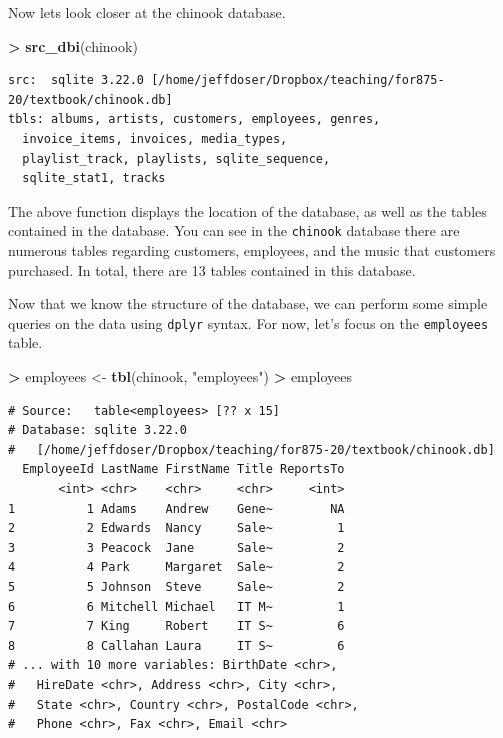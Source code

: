 \documentclass[
]{krantz}
\makeatletter
\newenvironment{Shaded}{\begin{snugshade}}{\end{snugshade}}
\newcommand{\KeywordTok}[1]{\textcolor[rgb]{0.27,0.27,0.27}{\textbf{#1}}}
\newcommand{\NormalTok}[1]{#1}
\newcommand{\OperatorTok}[1]{\textcolor[rgb]{0.43,0.43,0.43}{\textbf{#1}}}
\newcommand{\StringTok}[1]{\textcolor[rgb]{0.5,0.5,0.5}{#1}}
\newenvironment{kframe}{%
\medskip{}
\setlength{\fboxsep}{.8em}
 \def\at@end@of@kframe{}%
 \ifinner\ifhmode%
  \def\at@end@of@kframe{\end{minipage}}%
  \begin{minipage}{\columnwidth}%
 \fi\fi%
 \def\FrameCommand##1{\hskip\@totalleftmargin \hskip-\fboxsep
 \colorbox{shadecolor}{##1}\hskip-\fboxsep
     \hskip-\linewidth \hskip-\@totalleftmargin \hskip\columnwidth}%
 \MakeFramed {\advance\hsize-\width
   \@totalleftmargin\z@ \linewidth\hsize
   \@setminipage}}%
 {\par\unskip\endMakeFramed%
 \at@end@of@kframe}
\renewenvironment{Shaded}{\begin{kframe}}{\end{kframe}}
\makeatother
\begin{document}
Now lets look closer at the chinook database.

\begin{Shaded}
\begin{Highlighting}[]
\OperatorTok{\textgreater{}}\StringTok{ }\KeywordTok{src\_dbi}\NormalTok{(chinook)}
\end{Highlighting}
\end{Shaded}

\begin{verbatim}
src:  sqlite 3.22.0 [/home/jeffdoser/Dropbox/teaching/for875-20/textbook/chinook.db]
tbls: albums, artists, customers, employees, genres,
  invoice_items, invoices, media_types,
  playlist_track, playlists, sqlite_sequence,
  sqlite_stat1, tracks
\end{verbatim}

The above function displays the location of the database, as well as the tables contained in the database. You can see in the \texttt{chinook} database there are numerous tables regarding customers, employees, and the music that customers purchased. In total, there are 13 tables contained in this database.

Now that we know the structure of the database, we can perform some simple queries on the data using \texttt{dplyr} syntax. For now, let's focus on the \texttt{employees} table.

\begin{Shaded}
\begin{Highlighting}[]
\OperatorTok{\textgreater{}}\StringTok{ }\NormalTok{employees \textless{}{-}}\StringTok{ }\KeywordTok{tbl}\NormalTok{(chinook, }\StringTok{"employees"}\NormalTok{)}
\OperatorTok{\textgreater{}}\StringTok{ }\NormalTok{employees}
\end{Highlighting}
\end{Shaded}

\begin{verbatim}
# Source:   table<employees> [?? x 15]
# Database: sqlite 3.22.0
#   [/home/jeffdoser/Dropbox/teaching/for875-20/textbook/chinook.db]
  EmployeeId LastName FirstName Title ReportsTo
       <int> <chr>    <chr>     <chr>     <int>
1          1 Adams    Andrew    Gene~        NA
2          2 Edwards  Nancy     Sale~         1
3          3 Peacock  Jane      Sale~         2
4          4 Park     Margaret  Sale~         2
5          5 Johnson  Steve     Sale~         2
6          6 Mitchell Michael   IT M~         1
7          7 King     Robert    IT S~         6
8          8 Callahan Laura     IT S~         6
# ... with 10 more variables: BirthDate <chr>,
#   HireDate <chr>, Address <chr>, City <chr>,
#   State <chr>, Country <chr>, PostalCode <chr>,
#   Phone <chr>, Fax <chr>, Email <chr>
\end{verbatim}
\end{document}
